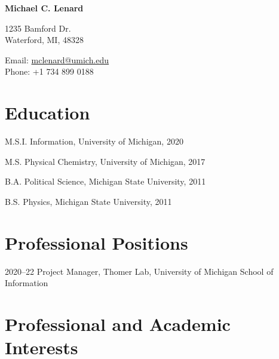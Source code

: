 \documentclass[12pt,letterpaper]{report}
\newcommand{\myname}{Michael C. Lenard}
\newcommand{\namefont}[1]{{\normalfont\bfseries\Huge{#1}}}
\begin{document}
 \raggedright

\namefont{\myname}

\vspace{1em}
\begin{minipage}[t]{0.68\textwidth}
        1235 Bamford Dr. \\
Waterford, MI, 48328
\end{minipage}
\begin{minipage}[t]{0.31\textwidth}
        Email: \href{mailto:mclenard@umich.edu}{mclenard@umich.edu} \\
        Phone: +1 734 899 0188
\end{minipage}
\vspace{0.5em}



\section*{Education}

\begin{tablist}

	\item[M.S.I.] \tab Information, University of Michigan, 2020

	\item[M.S.]  \tab Physical Chemistry, University of Michigan, 2017

	\item[B.A.]  \tab Political Science, Michigan State University, 2011
        
	\item[B.S.]  \tab Physics, Michigan State University, 2011

\end{tablist}



\section*{Professional Positions}

\begin{tablist}

\item[2020--22] \tab Project Manager, Thomer Lab, University of Michigan School of Information

\end{tablist}



\section*{Professional and Academic Interests}
\end{document}
